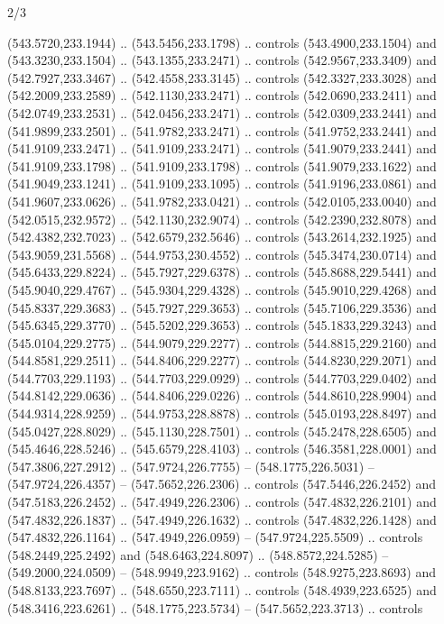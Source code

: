 \begin{flagdescription}{2/3}
\begin{scope}[xshift=0.5\flaglength,yshift=0.5\flagwidth,scale=\flagwidth/495.65]
\begin{scope}[y=0.8pt, x=0.8pt, yscale=-1,shift={(-463.76,-309.78)}]
  (543.5720,233.1944) .. (543.5456,233.1798) .. controls (543.4900,233.1504) and
  (543.3230,233.1504) .. (543.1355,233.2471) .. controls (542.9567,233.3409) and
  (542.7927,233.3467) .. (542.4558,233.3145) .. controls (542.3327,233.3028) and
  (542.2009,233.2589) .. (542.1130,233.2471) .. controls (542.0690,233.2411) and
  (542.0749,233.2531) .. (542.0456,233.2471) .. controls (542.0309,233.2441) and
  (541.9899,233.2501) .. (541.9782,233.2471) .. controls (541.9752,233.2441) and
  (541.9109,233.2471) .. (541.9109,233.2471) .. controls (541.9079,233.2441) and
  (541.9109,233.1798) .. (541.9109,233.1798) .. controls (541.9079,233.1622) and
  (541.9049,233.1241) .. (541.9109,233.1095) .. controls (541.9196,233.0861) and
  (541.9607,233.0626) .. (541.9782,233.0421) .. controls (542.0105,233.0040) and
  (542.0515,232.9572) .. (542.1130,232.9074) .. controls (542.2390,232.8078) and
  (542.4382,232.7023) .. (542.6579,232.5646) .. controls (543.2614,232.1925) and
  (543.9059,231.5568) .. (544.9753,230.4552) .. controls (545.3474,230.0714) and
  (545.6433,229.8224) .. (545.7927,229.6378) .. controls (545.8688,229.5441) and
  (545.9040,229.4767) .. (545.9304,229.4328) .. controls (545.9010,229.4268) and
  (545.8337,229.3683) .. (545.7927,229.3653) .. controls (545.7106,229.3536) and
  (545.6345,229.3770) .. (545.5202,229.3653) .. controls (545.1833,229.3243) and
  (545.0104,229.2775) .. (544.9079,229.2277) .. controls (544.8815,229.2160) and
  (544.8581,229.2511) .. (544.8406,229.2277) .. controls (544.8230,229.2071) and
  (544.7703,229.1193) .. (544.7703,229.0929) .. controls (544.7703,229.0402) and
  (544.8142,229.0636) .. (544.8406,229.0226) .. controls (544.8610,228.9904) and
  (544.9314,228.9259) .. (544.9753,228.8878) .. controls (545.0193,228.8497) and
  (545.0427,228.8029) .. (545.1130,228.7501) .. controls (545.2478,228.6505) and
  (545.4646,228.5246) .. (545.6579,228.4103) .. controls (546.3581,228.0001) and
  (547.3806,227.2912) .. (547.9724,226.7755) -- (548.1775,226.5031) --
  (547.9724,226.4357) -- (547.5652,226.2306) .. controls (547.5446,226.2452) and
  (547.5183,226.2452) .. (547.4949,226.2306) .. controls (547.4832,226.2101) and
  (547.4832,226.1837) .. (547.4949,226.1632) .. controls (547.4832,226.1428) and
  (547.4832,226.1164) .. (547.4949,226.0959) -- (547.9724,225.5509) .. controls
  (548.2449,225.2492) and (548.6463,224.8097) .. (548.8572,224.5285) --
  (549.2000,224.0509) -- (548.9949,223.9162) .. controls (548.9275,223.8693) and
  (548.8133,223.7697) .. (548.6550,223.7111) .. controls (548.4939,223.6525) and
  (548.3416,223.6261) .. (548.1775,223.5734) -- (547.5652,223.3713) .. controls

\end{scope}
\end{scope}
\end{flagdescription}
